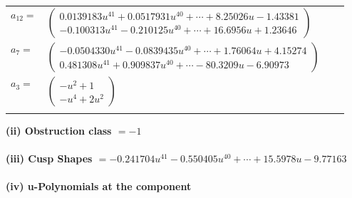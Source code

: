 \documentclass[1p]{elsarticle_modified}
\theoremstyle{definition}
\begin{document}
\begin{tabular}{m{7pt} m{180pt} m{7pt} m{180pt} }
\flushright $a_{12}=$&$\begin{pmatrix}0.0139183 u^{41}+0.0517931 u^{40}+\cdots+8.25026 u-1.43381\\-0.100313 u^{41}-0.210125 u^{40}+\cdots+16.6956 u+1.23646\end{pmatrix}$ \\
\flushright $a_{7}=$&$\begin{pmatrix}-0.0504330 u^{41}-0.0839435 u^{40}+\cdots+1.76064 u+4.15274\\0.481308 u^{41}+0.909837 u^{40}+\cdots-80.3209 u-6.90973\end{pmatrix}$ \\
\flushright $a_{3}=$&$\begin{pmatrix}- u^2+1\\- u^4+2 u^2\end{pmatrix}$\\&\end{tabular}
\flushleft \textbf{(ii) Obstruction class $= -1$}\\~\\
\flushleft \textbf{(iii) Cusp Shapes $= -0.241704 u^{41}-0.550405 u^{40}+\cdots+15.5978 u-9.77163$}\\~\\
\newpage\renewcommand{\arraystretch}{1}
\flushleft \textbf{(iv) u-Polynomials at the component}\newline \\
\end{document}

